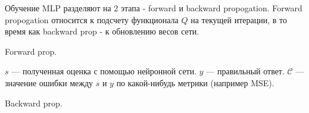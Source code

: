 \documentclass[11pt, oneside]{article}   	%
\begin{document}
	\newpage
	Обучение MLP разделяют на 2 этапа - forward и backward propogation.
	Forward propogation относится к подсчету функционала $ Q $ на текущей итерации, в то время как backward prop - к обновлению весов сети.
	
	\begin{figure}[h]
	\end{figure}
	
	Forward prop.
	\begin{figure}[h]
	\end{figure}
	
	\begin{figure}[h]
	\end{figure}
	
	$s$ --- полученная оценка с помощью нейронной сети. $y$ --- правильный ответ. $\mathcal{C}$ --- значение ошибки между $s$ и $y$ по какой-нибудь метрики (например MSE).
	
	\newpage
	Backward prop.
	\begin{figure}[h]
	\end{figure}
\end{document}
